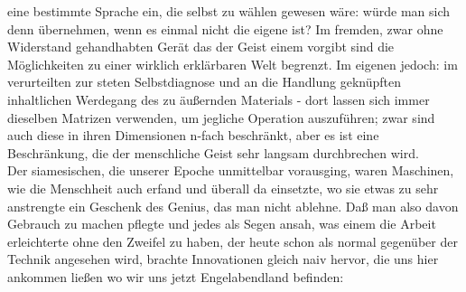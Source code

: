 \documentclass[
]{article}
\begin{document}
eine bestimmte Sprache ein, die selbst zu wählen gewesen wäre: würde man
sich denn übernehmen, wenn es einmal nicht die eigene ist? Im fremden,
zwar ohne Widerstand gehandhabten Gerät das der Geist einem vorgibt sind
die Möglichkeiten zu einer wirklich erklärbaren Welt begrenzt. Im
eigenen jedoch: im verurteilten zur steten Selbstdiagnose und an die
Handlung geknüpften inhaltlichen Werdegang des zu äußernden Materials -
dort lassen sich immer dieselben Matrizen verwenden, um jegliche
Operation auszuführen; zwar sind auch diese in ihren Dimensionen n-fach
beschränkt, aber es ist eine Beschränkung, die der menschliche Geist
sehr langsam durchbrechen wird.\\
Der siamesischen, die unserer Epoche unmittelbar vorausging, waren
Maschinen, wie die Menschheit auch erfand und überall da einsetzte, wo
sie etwas zu sehr anstrengte ein Geschenk des Genius, das man nicht
ablehne. Daß man also davon Gebrauch zu machen pflegte und jedes als
Segen ansah, was einem die Arbeit erleichterte ohne den Zweifel zu
haben, der heute schon als normal gegenüber der Technik angesehen wird,
brachte Innovationen gleich naiv hervor, die uns hier ankommen ließen wo
wir uns jetzt Engelabendland befinden:
\end{document}
